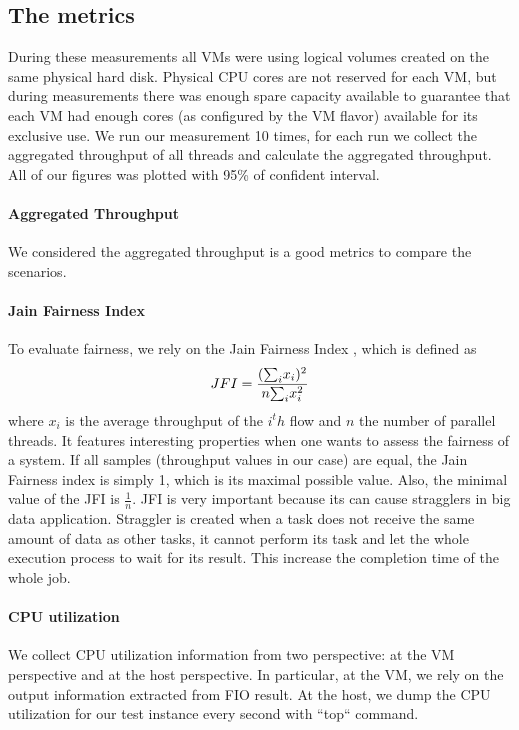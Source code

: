 \documentclass{acmsig}
\begin{document}
\subsection{The metrics}

During these measurements all VMs were using logical volumes created on the same physical hard disk. Physical CPU cores are not reserved for each VM, but during measurements there was enough spare capacity available to guarantee that each VM had enough cores (as configured by the VM flavor) available for its exclusive use. We run our measurement 10 times, for each run we collect the aggregated throughput of all threads and calculate the aggregated throughput. All of our figures was plotted with 95\% of confident interval.

\paragraph{Aggregated Throughput}
  We considered the aggregated throughput is a good metrics to compare the scenarios. %

\paragraph{Jain Fairness Index}
  To evaluate fairness, we rely on the Jain Fairness Index \cite{jain98}, which is defined as
  $$JFI={({\sum}_{i}x_{i})^{2}\over n{\sum}_{i}x_{i}^{2}}$$
  where $x_{i}$ is the average throughput of the $i^th$ flow and $n$ the number of parallel threads. It features interesting properties when one wants to assess the fairness of a system. If all samples (throughput values in our case) are equal, the Jain Fairness index is simply 1, which is its maximal possible value. Also, the minimal value of the JFI is $\frac{1}{n}$. JFI is very important because its can cause stragglers in big data application. Straggler is created when a task does not receive the same amount of data as other tasks, it cannot perform its task and let the whole execution process to wait for its result. This increase the completion time of the whole job.
  
\paragraph{CPU utilization}

We collect CPU utilization information from two perspective: at the VM perspective and at the host perspective. In particular, at the VM, we rely on the output information extracted from FIO result. At the host, we dump the CPU utilization for our test instance every second with ``top`` command.
\end{document}

